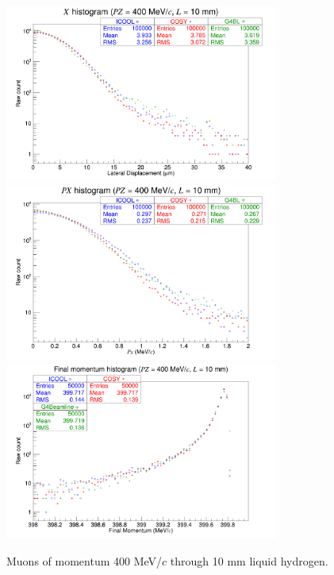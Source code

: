 \begin{figure}[!htb]
  \centering
    \includegraphics[width=0.8\textwidth]{Validation/LH/X.400.10.png} 
    \includegraphics[width=0.8\textwidth]{Validation/LH/PX.400.10.png} 
    \includegraphics[width=0.8\textwidth]{Validation/LH/strag.400.10.png} 
  \caption{Muons of momentum 400 MeV/$c$ through 10 mm liquid hydrogen.}
  \label{fig:400.10}
\end{figure}

